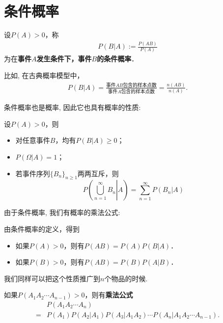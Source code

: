 \section{条件概率}

\begin{definition}
    设$P(A)>0$，称
    \begin{align*}
        P(B|A):=\frac{P(AB)}{P(A)}
    \end{align*}
    为在\textbf{事件$A$发生条件下，事件$B$的条件概率}．
\end{definition}

比如, 在古典概率模型中，
\begin{align*}
    P(B|A)=\frac{\mbox{事件$AB$包含的样本点数}}{\mbox{事件$A$包含的样本点数}}=\frac{n(AB)}{n(A)}.
\end{align*}

条件概率也是概率, 因此它也具有概率的性质:

\begin{proposition}
    设$P(A)>0$，则
    \begin{itemize}
        \item 对任意事件$B$，均有$P(B|A)\ge 0$；
        \item $P(\Omega|A)=1$；
        \item 若事件序列$\{B_n\}_{n\ge 1}$两两互斥，则
              $$P\left( \left. \bigcup_{n=1}^{\infty} B_n \right| A\right)=\sum_{n=1}^{\infty} P(B_n|A)$$
    \end{itemize}
\end{proposition}

由于条件概率, 我们有概率的乘法公式:

\begin{theorem}[乘法公式]
    由条件概率的定义，得到
    \begin{itemize}
        \item 如果$P(A)>0$，则有$P(AB)=P(A)P(B|A)$．
        \item 如果$P(B)>0$，则有$P(AB)=P(B)P(A|B)$．
    \end{itemize}
\end{theorem}

我们同样可以把这个性质推广到$n$个物品的时候.

\begin{corollary}
    如果$P(A_1 A_2\cdots A_{n-1})>0$，则有\textbf{乘法公式}
    \begin{align*}
          & P(A_1A_2\cdots A_n)                                                \\
        = & P(A_1)P(A_2|A_1)P(A_3|A_1 A_2)\cdots P(A_n|A_1 A_2\cdots A_{n-1}).
    \end{align*}
\end{corollary}

